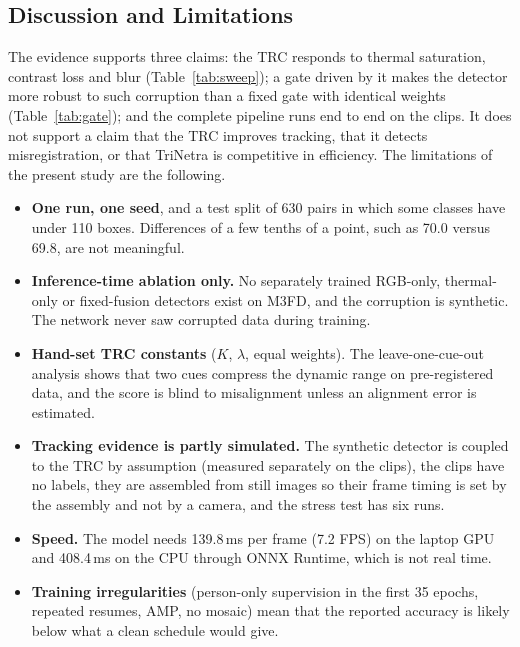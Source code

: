\documentclass[journal]{IEEEtran}
\begin{document}
\subsection{Discussion and Limitations}
The evidence supports three claims: the TRC responds to thermal saturation, contrast loss and blur (Table~\ref{tab:sweep}); a gate driven by it makes the detector more robust to such corruption than a fixed gate with identical weights (Table~\ref{tab:gate}); and the complete pipeline runs end to end on the clips. It does not support a claim that the TRC improves tracking, that it detects misregistration, or that TriNetra is competitive in efficiency. The limitations of the present study are the following.
\begin{itemize}
\item \textbf{One run, one seed}, and a test split of 630 pairs in which some classes have under 110 boxes. Differences of a few tenths of a point, such as 70.0 versus 69.8, are not meaningful.
\item \textbf{Inference-time ablation only.} No separately trained RGB-only, thermal-only or fixed-fusion detectors exist on M3FD, and the corruption is synthetic. The network never saw corrupted data during training.
\item \textbf{Hand-set TRC constants} ($K$, $\lambda$, equal weights). The leave-one-cue-out analysis shows that two cues compress the dynamic range on pre-registered data, and the score is blind to misalignment unless an alignment error is estimated.
\item \textbf{Tracking evidence is partly simulated.} The synthetic detector is coupled to the TRC by assumption (measured separately on the clips), the clips have no labels, they are assembled from still images so their frame timing is set by the assembly and not by a camera, and the stress test has six runs.
\item \textbf{Speed.} The model needs 139.8\,ms per frame (7.2 FPS) on the laptop GPU and 408.4\,ms on the CPU through ONNX Runtime, which is not real time.
\item \textbf{Training irregularities} (person-only supervision in the first 35 epochs, repeated resumes, AMP, no mosaic) mean that the reported accuracy is likely below what a clean schedule would give.
\end{itemize}

\end{document}
